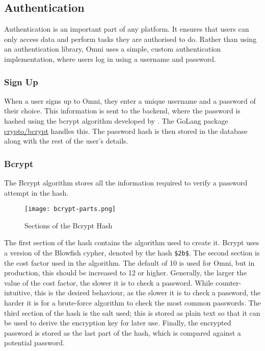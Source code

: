 \subsection{Authentication}
Authentication is an important part of any platform. It ensures that users can only access data and perform tasks they are authorised to do. 
Rather than using an authentication library, Omni uses a simple, custom authentication implementation, where users log in using a username and password.

\subsubsection{Sign Up}
\label{sec:impl-auth-signup}
When a user signs up to Omni, they enter a unique username and a password of their choice.
This information is sent to the backend, where the password is hashed using the bcrypt algorithm developed by \citeauthor{provos1999future}.
The GoLang package \underline{\href{https://pkg.go.dev/golang.org/x/crypto/bcrypt}{crypto/bcrypt}} \nocite{gobcryptpkg} handles this. The password hash is then stored in the database along with the rest of the user's details.

\subsubsection{Bcrypt}
The Bcrypt algorithm stores all the information required to verify a password attempt in the hash.

\begin{figure}[htbp]
\texttt{[image: bcrypt-parts.png]}
\centering
\caption{Sections of the Bcrypt Hash}
\label{fig:bcrypt-parts}
\end{figure}

The first section of the hash contains the algorithm used to create it. Bcrypt uses a version of the Blowfish cypher, denoted by the hash \verb|$2b$|.
The second section is the cost factor used in the algorithm. The default of 10 is used for Omni, but in production, this should be increased to 12 or higher.
Generally, the larger the value of the cost factor, the slower it is to check a password.
While counter-intuitive, this is the desired behaviour, as the slower it is to check a password, the harder it is for a brute-force algorithm to check the most common passwords.
The third section of the hash is the salt used; this is stored as plain text so that it can be used to derive the encryption key for later use.
Finally, the encrypted password is stored as the last part of the hash, which is compared against a potential password.

